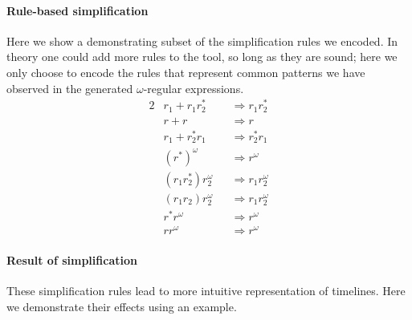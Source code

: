 \documentclass[conference]{IEEEtran}
\theoremstyle{definition}
\theoremstyle{remark}
\begin{document}
\paragraph*{Rule-based simplification}
Here we show a demonstrating subset of the simplification rules we encoded. In theory one could add more rules to the tool, so long as they are sound; here we only choose to encode the rules that represent common patterns we have observed in the generated $\omega$-regular expressions.
\begin{alignat*}{2}
        & r_1 + r_1r_2^* && \Longrightarrow r_1r_2^* \\
        & r + r && \Longrightarrow r \\
        & r_1 + r_2^*r_1 && \Longrightarrow r_2^*r_1 \\
        & (r^*)^{\omega} && \Longrightarrow r^{\omega} \\
        & (r_1r_2^*)r_2^{\omega} && \Longrightarrow r_1r_2^{\omega} \\
        & (r_1r_2)r_2^{\omega} && \Longrightarrow r_1r_2^{\omega} \\
        & r^*r^{\omega} && \Longrightarrow r^{\omega} \\
        & rr^{\omega} && \Longrightarrow r^{\omega}
\end{alignat*}

\paragraph*{Result of simplification}
These simplification rules lead to more intuitive representation of timelines. Here we demonstrate their effects using an example.
\end{document}
